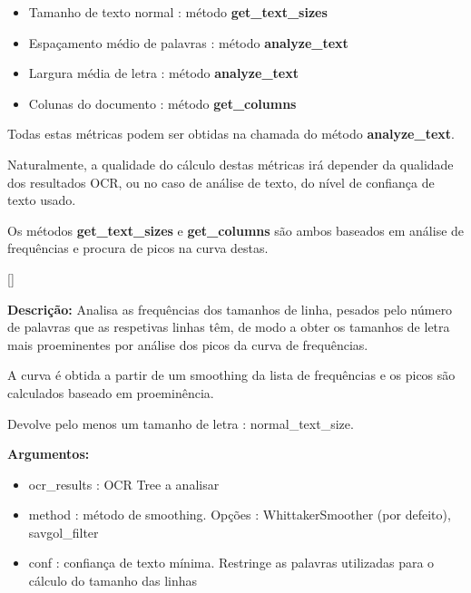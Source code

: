 \begin{itemize}
	\item Tamanho de texto normal : método \textbf{get\_text\_sizes}
	\item Espaçamento médio de palavras : método \textbf{analyze\_text}
	\item Largura média de letra : método \textbf{analyze\_text}
	\item Colunas do documento : método \textbf{get\_columns}
\end{itemize}

Todas estas métricas podem ser obtidas na chamada do método \textbf{analyze\_text}.

Naturalmente, a qualidade do cálculo destas métricas irá depender da qualidade dos resultados OCR, ou no caso de análise de texto, do nível de confiança de texto usado.

Os métodos \textbf{get\_text\_sizes} e \textbf{get\_columns} são ambos baseados em análise de frequências e procura de picos na curva destas.


[\normalsize]

\textbf{Descrição:} Analisa as frequências dos tamanhos de linha, pesados pelo número de palavras que as respetivas linhas têm, de modo a obter os tamanhos de letra mais proeminentes por análise dos picos da curva de frequências.

A curva é obtida a partir de um smoothing da lista de frequências e os picos são calculados baseado em proeminência.

Devolve pelo menos um tamanho de letra : normal\_text\_size.

\textbf{Argumentos:}
\begin{itemize}\setlength\itemsep{-0.3em}
	\vspace{-0.5em}
	\item ocr\_results : OCR Tree a analisar
	\item method : método de smoothing. Opções : WhittakerSmoother (por defeito), savgol\_filter
	\item conf : confiança de texto mínima. Restringe as palavras utilizadas para o cálculo do tamanho das linhas
\end{itemize}

